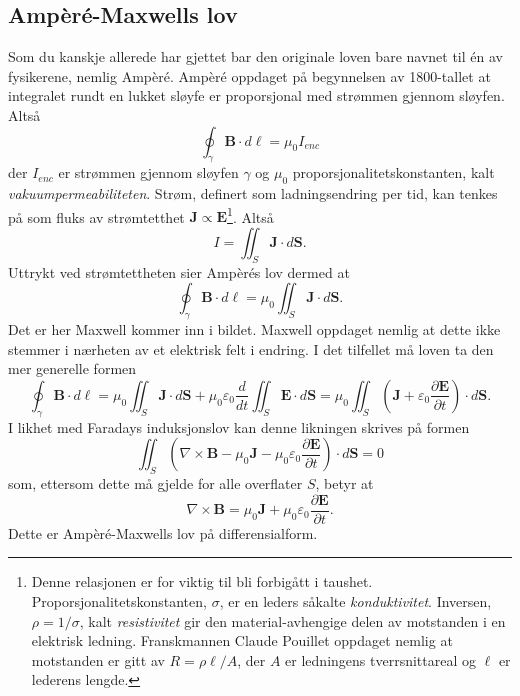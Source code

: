 \documentclass[twoside,utf8]{article}
\begin{document}
\subsection{Ampèré-Maxwells lov}
Som du kanskje allerede har gjettet bar den originale loven bare navnet til én av fysikerene, nemlig Ampèré. Ampèré oppdaget på begynnelsen av 1800-tallet at integralet rundt en lukket sløyfe er proporsjonal med strømmen gjennom sløyfen. Altså
$$
\oint_\gamma \mathbf{B} \cdot d\mathbf{\ell} = \mu_0 I_{enc}
$$
der $I_{enc}$ er strømmen gjennom sløyfen $\gamma$ og $\mu_0$ proporsjonalitetskonstanten, kalt {\it vakuumpermeabiliteten}. Strøm, definert som ladningsendring per tid, kan tenkes på som fluks av strømtetthet $\mathbf{J} \propto \mathbf{E}$\footnote{Denne relasjonen er for viktig til bli forbigått i taushet. Proporsjonalitetskonstanten, $\sigma$, er en leders såkalte {\it konduktivitet}. Inversen, $\rho=1/\sigma$, kalt {\it resistivitet} gir den material-avhengige delen av motstanden i en elektrisk ledning. Franskmannen Claude Pouillet oppdaget nemlig at motstanden er gitt av $R=\rho \ell /A$, der $A$ er ledningens tverrsnittareal og $\ell$ er lederens lengde. }. Altså
$$
I = \iint_S \mathbf{J}\cdot d\mathbf{S}.
$$
Uttrykt ved strømtettheten sier Ampèrés lov dermed at
$$
\oint_\gamma \mathbf{B} \cdot d\mathbf{\ell} = \mu_0 \iint_S \mathbf{J}\cdot d\mathbf{S}.
$$
Det er her Maxwell kommer inn i bildet. Maxwell oppdaget nemlig at dette ikke stemmer i nærheten av et elektrisk felt i endring. I det tilfellet må loven ta den mer generelle formen
$$
\oint_\gamma \mathbf{B} \cdot d\mathbf{\ell}
=
\mu_0 \iint_S
\mathbf{J}\cdot d\mathbf{S}
+
\mu_0 \varepsilon_0 \frac{d}{dt}\iint_S
\mathbf{E}\cdot d\mathbf{S}
=
\mu_0 \iint_S \left(
\mathbf{J}
+\varepsilon_0 \frac{\partial \mathbf{E}}{\partial t}
\right)\cdot d\mathbf{S}.
$$
I likhet med Faradays induksjonslov kan denne likningen skrives på formen
$$
\iint_S \left(\nabla \times \mathbf{B}
-\mu_0\mathbf{J}
-\mu_0\varepsilon_0 \frac{\partial \mathbf{E}}{\partial t}
\right)\cdot d\mathbf{S} = 0
$$
som, ettersom dette må gjelde for alle overflater $S$, betyr at
$$
\nabla \times \mathbf{B}
=
\mu_0\mathbf{J} + \mu_0\varepsilon_0 \frac{\partial \mathbf{E}}{\partial t}.
$$
Dette er Ampèré-Maxwells lov på differensialform.
\end{document}
